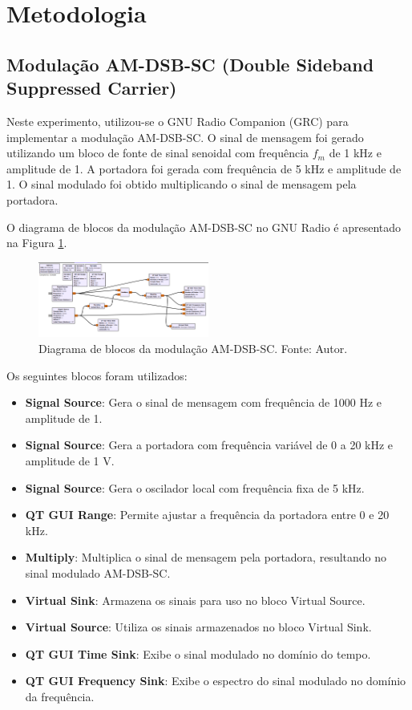 \section{Metodologia}

\subsection{Modulação AM-DSB-SC (Double Sideband Suppressed Carrier)}

Neste experimento, utilizou-se o GNU Radio Companion (GRC) para implementar a modulação AM-DSB-SC. O sinal de mensagem foi gerado utilizando um bloco de fonte de sinal senoidal com frequência $f_{m}$ de 1 kHz e amplitude de 1. A portadora foi gerada com frequência de 5 kHz e amplitude de 1. O sinal modulado foi obtido multiplicando o sinal de mensagem pela portadora.

O diagrama de blocos da modulação AM-DSB-SC no GNU Radio é apresentado na Figura \ref{fig:modulacao_am_sc}.

\begin{figure}
    \centering
    \includegraphics[width=0.5\textwidth]{images/mod_am_sc_gnu.png}
    \caption{Diagrama de blocos da modulação AM-DSB-SC. Fonte: Autor.}
    \label{fig:modulacao_am_sc}
\end{figure}

Os seguintes blocos foram utilizados:

\begin{itemize}
    \item \textbf{Signal Source}: Gera o sinal de mensagem com frequência de 1000 Hz e amplitude de 1.
    \item \textbf{Signal Source}: Gera a portadora com frequência variável de 0 a 20 kHz e amplitude de 1 V.
    \item \textbf{Signal Source}: Gera o oscilador local com frequência fixa de 5 kHz.
    \item \textbf{QT GUI Range}: Permite ajustar a frequência da portadora entre 0 e 20 kHz.
    \item \textbf{Multiply}: Multiplica o sinal de mensagem pela portadora, resultando no sinal modulado AM-DSB-SC.
    \item \textbf{Virtual Sink}: Armazena os sinais para uso no bloco Virtual Source.
    \item \textbf{Virtual Source}: Utiliza os sinais armazenados no bloco Virtual Sink.
    \item \textbf{QT GUI Time Sink}: Exibe o sinal modulado no domínio do tempo.
    \item \textbf{QT GUI Frequency Sink}: Exibe o espectro do sinal modulado no domínio da frequência.
\end{itemize}

